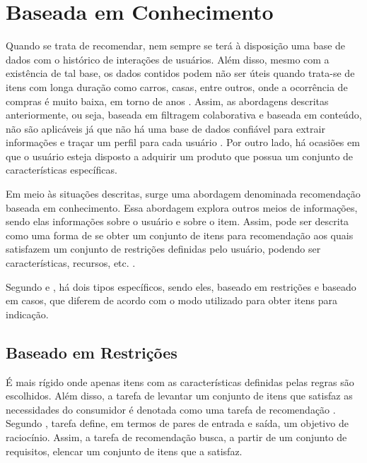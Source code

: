                 
            
        
\section{Baseada em Conhecimento} 
    
Quando se trata de recomendar, nem sempre se terá à disposição uma base de dados com o histórico de interações de usuários. Além disso, mesmo com a existência de tal base, os dados contidos podem não ser úteis quando trata-se de itens com longa duração como carros, casas, entre outros, onde a ocorrência de compras é muito baixa, em torno de anos \cite{Jannach2010}. Assim, as abordagens descritas anteriormente, ou seja, baseada em filtragem colaborativa e baseada em conteúdo, não são aplicáveis já que não há uma base de dados confiável para extrair informações e traçar um perfil para cada usuário  \cite{Ricci2010}. Por outro lado, há ocasiões em que o usuário esteja disposto a adquirir um produto que possua um conjunto de características específicas. 

Em meio às situações descritas, surge uma abordagem denominada recomendação baseada em conhecimento. Essa abordagem explora outros meios de informações, sendo elas informações sobre o usuário e sobre o item.
Assim, pode ser descrita como uma forma de se obter um conjunto de itens para recomendação aos quais satisfazem um conjunto de restrições definidas pelo usuário, podendo ser características, recursos, etc. \cite{Jannach2010}.

Segundo  e , há dois tipos específicos, sendo eles, baseado em restrições e baseado em casos, que diferem de acordo com o modo utilizado para obter itens para indicação.

\subsection{Baseado em Restrições}
    É mais rígido onde apenas itens com as características definidas pelas regras são escolhidos. Além disso, a tarefa de levantar um conjunto de itens que satisfaz as necessidades do consumidor é denotada como uma tarefa de recomendação \cite{Ricci2010}. Segundo , tarefa define, em termos de pares de entrada e saída, um objetivo de raciocínio. Assim, a tarefa de recomendação busca, a partir de um conjunto de requisitos, elencar um conjunto de itens que a satisfaz.
    
